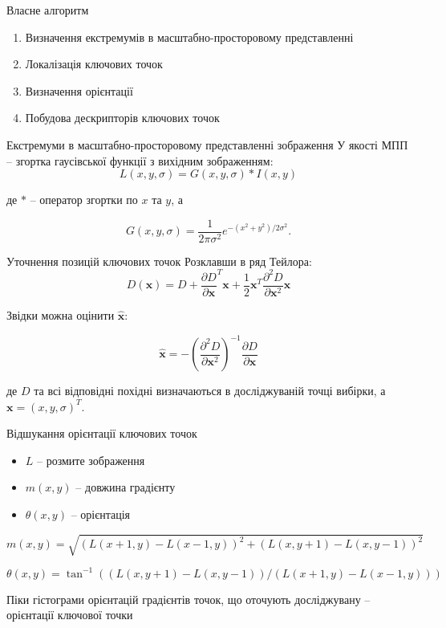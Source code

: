 \documentclass{beamer}
\begin{document}
\begin{frame}{Власне алгоритм}
  \begin{enumerate}
    \item Визначення екстремумів в масштабно-просторовому представленні
    \item Локалізація ключових точок
    \item Визначення орієнтації
    \item Побудова дескрипторів ключових точок
  \end{enumerate}
\end{frame}

\begin{frame}{Екстремуми в масштабно-просторовому представленні зображення}
  У якості МПП -- згортка гаусівської функції з вихідним зображенням:
  \[
  L(x,y,\sigma) = G(x,y,\sigma) \ast I(x,y)
  \]

  де $\ast$ -- оператор згортки по $x$ та $y$, а

  \[
    G(x,y,\sigma) = \frac{1}{2\pi\sigma^2}e^{-(x^2+y^2)/2\sigma^2}.
  \]
\end{frame}

\begin{frame}{Уточнення позицій ключових точок}
  Розклавши в ряд Тейлора:
  \begin{equation}
    \label{eq:d-taylor}
    D(\mathbf{x}) = D + {\frac{\partial D}{\partial \mathbf{x}}}^T \mathbf{x} + \frac12 \mathbf{x}^T \frac{\partial ^2 D}{\partial\mathbf{x}^2}\mathbf{x}
  \end{equation}

  Звідки можна оцінити $\hat{\mathbf{x}}$:

  \begin{equation}
    \label{eq:extr-ext}
    \hat{\mathbf{x}} = -\left(\frac{\partial^2 D}{\partial \mathbf{x}^2}\right)^{-1} \frac{\partial D}{\partial \mathbf{x}}
  \end{equation}

  де $D$ та всі відповідні похідні визначаються в досліджуваній точці вибірки, а $\mathbf{x} = (x,y,\sigma)^T$.
\end{frame}

\begin{frame}{Відшукання орієнтації ключових точок}
  \begin{itemize}
    \item $L$ -- розмите зображення
    \item $m(x,y)$ -- довжина градієнту
    \item $\theta(x,y)$ -- орієнтація
  \end{itemize}

  \[
    m(x,y) = \sqrt{(L(x+1, y) - L(x-1, y))^2 + (L(x,y+1) - L(x,y-1))^2} 
  \]

  \[
    \theta(x,y) = \tan^{-1}((L(x,y+1) - L(x,y-1)) / (L(x+1,y) - L(x-1,y)))
  \]

  Піки гістограми орієнтацій градієнтів точок, що оточують досліджувану -- орієнтації ключової точки
\end{frame}
\end{document}
